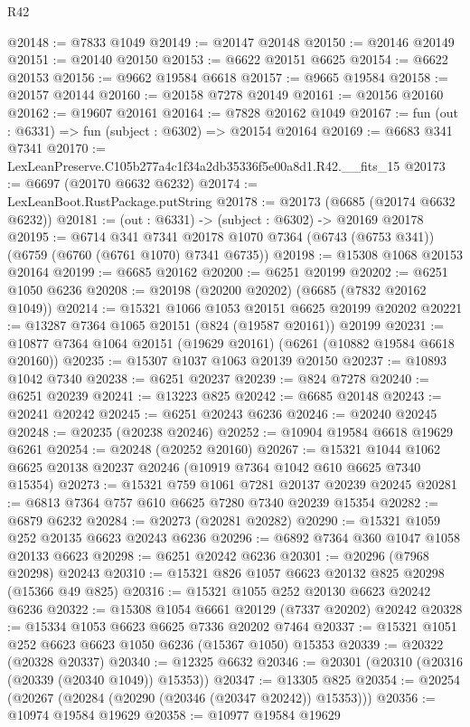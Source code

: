 \begin{lexlean}{R42}
\begin{coremodule}
{@20148 := @7833 @1049
@20149 := @20147 @20148
@20150 := @20146 @20149
@20151 := @20140 @20150
@20153 := @6622 @20151 @6625
@20154 := @6622 @20153
@20156 := @9662 @19584 @6618
@20157 := @9665 @19584
@20158 := @20157 @20144
@20160 := @20158 @7278 @20149
@20161 := @20156 @20160
@20162 := @19607 @20161
@20164 := @7828 @20162 @1049
@20167 := fun (out : @6331) => fun (subject : @6302) => @20154 @20164
@20169 := @6683 @341 @7341
@20170 := LexLeanPreserve.C105b277a4c1f34a2db35336f5e00a8d1.R42.__fits_15
@20173 := @6697 (@20170 @6632 @6232)
@20174 := LexLeanBoot.RustPackage.putString
@20178 := @20173 (@6685 (@20174 @6632 @6232))
@20181 := (out : @6331) -> (subject : @6302) -> @20169 @20178
@20195 := @6714
    @341
    @7341
    @20178
    @1070
    @7364
    (@6743 (@6753 @341))
    (@6759 (@6760 (@6761 @1070) @7341 @6735))
@20198 := @15308 @1068 @20153 @20164
@20199 := @6685 @20162
@20200 := @6251 @20199
@20202 := @6251 @1050 @6236
@20208 := @20198 (@20200 @20202) (@6685 (@7832 @20162 @1049))
@20214 := @15321 @1066 @1053 @20151 @6625 @20199 @20202
@20221 := @13287 @7364 @1065 @20151 (@824 (@19587 @20161)) @20199
@20231 := @10877 @7364 @1064 @20151 (@19629 @20161) (@6261 (@10882 @19584 @6618 @20160))
@20235 := @15307 @1037 @1063 @20139 @20150
@20237 := @10893 @1042 @7340
@20238 := @6251 @20237
@20239 := @824 @7278
@20240 := @6251 @20239
@20241 := @13223 @825
@20242 := @6685 @20148
@20243 := @20241 @20242
@20245 := @6251 @20243 @6236
@20246 := @20240 @20245
@20248 := @20235 (@20238 @20246)
@20252 := @10904 @19584 @6618 @19629 @6261
@20254 := @20248 (@20252 @20160)
@20267 := @15321 @1044 @1062 @6625 @20138 @20237 @20246 (@10919 @7364 @1042 @610 @6625 @7340 @15354)
@20273 := @15321 @759 @1061 @7281 @20137 @20239 @20245
@20281 := @6813 @7364 @757 @610 @6625 @7280 @7340 @20239 @15354
@20282 := @6879 @6232
@20284 := @20273 (@20281 @20282)
@20290 := @15321 @1059 @252 @20135 @6623 @20243 @6236
@20296 := @6892 @7364 @360 @1047 @1058 @20133 @6623
@20298 := @6251 @20242 @6236
@20301 := @20296 (@7968 @20298) @20243
@20310 := @15321 @826 @1057 @6623 @20132 @825 @20298 (@15366 @49 @825)
@20316 := @15321 @1055 @252 @20130 @6623 @20242 @6236
@20322 := @15308 @1054 @6661 @20129 (@7337 @20202) @20242
@20328 := @15334 @1053 @6623 @6625 @7336 @20202 @7464
@20337 := @15321 @1051 @252 @6623 @6623 @1050 @6236 (@15367 @1050) @15353
@20339 := @20322 (@20328 @20337)
@20340 := @12325 @6632
@20346 := @20301 (@20310 (@20316 (@20339 (@20340 @1049)) @15353))
@20347 := @13305 @825
@20354 := @20254 (@20267 (@20284 (@20290 (@20346 (@20347 @20242)) @15353)))
@20356 := @10974 @19584 @19629
@20358 := @10977 @19584 @19629
}
\end{coremodule}
\end{lexlean}
